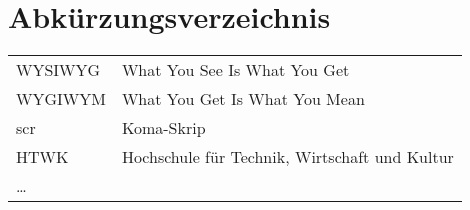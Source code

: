 \chapter*{Abkürzungsverzeichnis}


\begin{tabular}{ll}
	WYSIWYG		& What You See Is What You Get\\
	WYGIWYM		& What You Get Is What You Mean\\
	scr	 		& Koma-Skrip \\
	HTWK 		& Hochschule für Technik, Wirtschaft und Kultur  \\
	\dots
\end{tabular}
